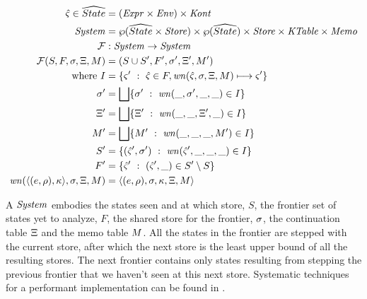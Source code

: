 \documentclass{llncs}
\begin{document}
\begin{align*}
  \hat\varsigma \in \widehat{State} &= (\mathit{Expr} \times \mathit{Env}) \times \mathit{Kont} \\
  \mathit{System} &= \wp(\widehat{State} \times \mathit{Store}) \times \wp(\widehat{State}) \times \mathit{Store} \times \mathit{KTable} \times \mathit{Memo} \\
  {\mathcal F} &: \mathit{System} \to \mathit{System} \\
  {\mathcal F}(S, F, \sigma, \Xi, M) &= (S \cup S', F', \sigma', \Xi', M') \\
  \text{where } I &= \{ \varsigma'\ :\ \hat\varsigma \in F, \mathit{wn}(\hat\varsigma,\sigma,\Xi,M) \longmapsto \varsigma'\} \\
                \sigma' &= \bigsqcup\{ \sigma'\ :\ \mathit{wn}(\_, \sigma',\_,\_) \in I\} \\
                \Xi' &=  \bigsqcup\{ \Xi'\ :\ \mathit{wn}(\_, \_, \Xi', \_) \in I\} \\
                M' &=  \bigsqcup\{ M'\ :\ \mathit{wn}(\_, \_, \_, M') \in I\} \\
                S' &= \{ (\hat\varsigma',\sigma')\ :\ \mathit{wn}(\hat\varsigma', \_, \_, \_) \in I\} \\
                F' &= \{ \hat\varsigma'\ :\ (\hat\varsigma',\_) \in S' \setminus S\} \\
                \mathit{wn}(\langle (e,\rho),\kappa \rangle,\sigma,\Xi,M)
                   &= \langle (e,\rho),\sigma,\kappa,\Xi,M \rangle
\end{align*}

A $\mathit{System}$ embodies the states seen and at which store, $S$, the
frontier set of states yet to analyze, $F$, the shared store for the
frontier, $\sigma$, the continuation table $\Xi$ and the memo
table $M$. All the states in the frontier are stepped with the
current store, after which the next store is the least upper bound of
all the resulting stores. The next frontier contains only states
resulting from stepping the previous frontier that we haven't seen at
this next store. Systematic techniques for a performant implementation
can be found in \citet{ianjohnson:oaam:2013}.
\end{document}
